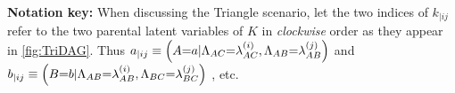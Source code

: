 \textbf{Notation key:}  When discussing the Triangle scenario, let the two indices of $k_{|ij}$ refer to the two parental latent variables of $K$ in \emph{clockwise} order as they appear in \cref{fig:TriDAG}. Thus ${a_{|ij} \equiv \parens*{
A\cramp{=}a|\Lambda_{AC}\cramp{=}\lambda_{AC}^{(i)},\Lambda_{AB}\cramp{=}\lambda_{AB}^{(j)}}}$ and ${b_{|ij} \equiv \parens*{B\cramp{=}b|\Lambda_{AB}\cramp{=}\lambda_{AB}^{(i)},\Lambda_{BC}\cramp{=}\lambda_{BC}^{(j)}}}$ , etc.







